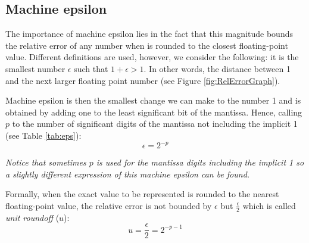         \FloatBarrier
        \subsection{Machine epsilon}

The importance of machine epsilon lies in the fact that this magnitude bounds the 
relative error of any number when is rounded to the closest floating-point value. 
Different definitions are used, however, we consider the following: 
it is the smallest number $\epsilon$ such that $1 + \epsilon > 1$. 
In other words, the distance between 1 and the next larger floating point number (see Figure \ref{fig:RelErrorGraph}).

Machine epsilon is then the smallest change we can make to the number 1 and is obtained by adding one to the least significant bit of the mantissa. 
Hence, calling $p$ to the number of significant digits of the mantissa not including the implicit 1 (see Table \ref{tab:eps}):
$$
\epsilon = 2^{-p}
$$ 

\textit{Notice that sometimes $p$ is used for the mantissa digits including the implicit 1 so a slightly different expression of this machine epsilon can be found.}

Formally, when the exact value to be represented is rounded to the nearest floating-point value, 
the relative error is not bounded by $\epsilon$ but $\frac{\epsilon}{2}$ which is called \textit{unit roundoff} ($u$):
$$
u = \frac{\epsilon}{2} = 2^{-p-1}
$$


